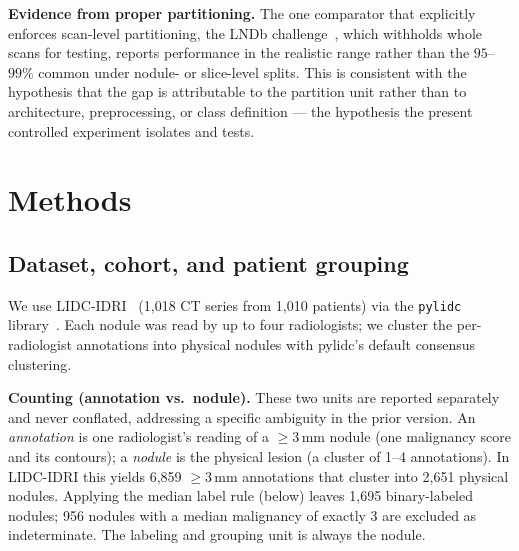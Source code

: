 \documentclass{ieeeaccess}
\newcommand{\vcite}[1]{\cite{#1}}
\begin{document}
\textbf{Evidence from proper partitioning.} The one comparator that explicitly enforces scan-level
partitioning, the LNDb challenge~\vcite{pedrosa2021}, which withholds whole scans for testing,
reports performance in the realistic range rather than the $95$--$99\%$ common under nodule- or
slice-level splits. This is consistent with the hypothesis that the gap is attributable to the
partition unit rather than to architecture, preprocessing, or class definition --- the hypothesis the
present controlled experiment isolates and tests.

\section{Methods}

\subsection{Dataset, cohort, and patient grouping}
We use LIDC-IDRI~\vcite{armato2011} (1{,}018 CT series from 1{,}010 patients) via the \texttt{pylidc}
library~\vcite{hancock2016}. Each nodule was read by up to four radiologists; we cluster the
per-radiologist annotations into physical nodules with pylidc's default consensus clustering.

\textbf{Counting (annotation vs.\ nodule).} These two units are reported separately and never
conflated, addressing a specific ambiguity in the prior version. An \emph{annotation} is one
radiologist's reading of a $\geq 3$\,mm nodule (one malignancy score and its contours); a
\emph{nodule} is the physical lesion (a cluster of 1--4 annotations). In LIDC-IDRI this yields
6{,}859 $\geq 3$\,mm annotations that cluster into 2{,}651 physical nodules. Applying the median
label rule (below) leaves 1{,}695 binary-labeled nodules; 956 nodules with a median malignancy of
exactly 3 are excluded as indeterminate. The labeling and grouping unit is always the nodule.
\end{document}
